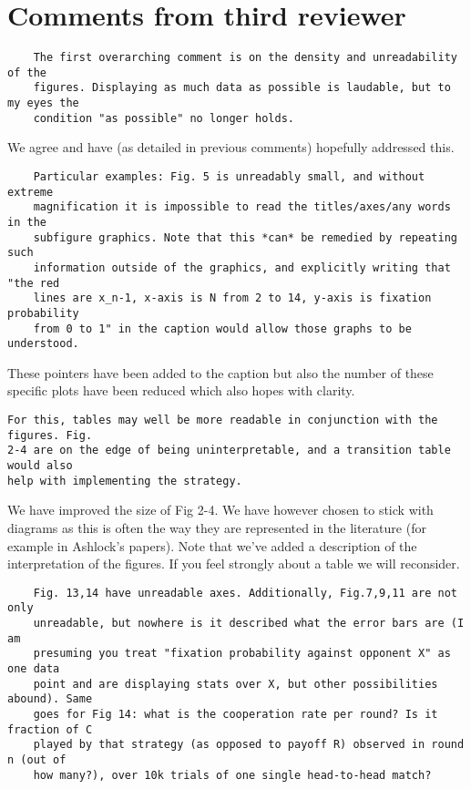 \documentclass[a4]{article}
\begin{document}
\section{Comments from third reviewer}

\begin{verbatim}
    The first overarching comment is on the density and unreadability of the
    figures. Displaying as much data as possible is laudable, but to my eyes the
    condition "as possible" no longer holds.
\end{verbatim}

We agree and have (as detailed in previous comments) hopefully addressed this.

\begin{verbatim}
    Particular examples: Fig. 5 is unreadably small, and without extreme
    magnification it is impossible to read the titles/axes/any words in the
    subfigure graphics. Note that this *can* be remedied by repeating such
    information outside of the graphics, and explicitly writing that "the red
    lines are x_n-1, x-axis is N from 2 to 14, y-axis is fixation probability
    from 0 to 1" in the caption would allow those graphs to be understood.
\end{verbatim}

These pointers have been added to the caption but also the number of these
specific plots have been reduced which also hopes with clarity.

\begin{verbatim}
For this, tables may well be more readable in conjunction with the figures. Fig.
2-4 are on the edge of being uninterpretable, and a transition table would also
help with implementing the strategy.
\end{verbatim}

We have improved the size of Fig 2-4. We have however chosen to stick with
diagrams as this is often the way they are represented in the literature (for
example in Ashlock's papers). Note that we've added a description of the
interpretation of the figures. If you feel strongly about a table we will
reconsider.

\begin{verbatim}
    Fig. 13,14 have unreadable axes. Additionally, Fig.7,9,11 are not only
    unreadable, but nowhere is it described what the error bars are (I am
    presuming you treat "fixation probability against opponent X" as one data
    point and are displaying stats over X, but other possibilities abound). Same
    goes for Fig 14: what is the cooperation rate per round? Is it fraction of C
    played by that strategy (as opposed to payoff R) observed in round n (out of
    how many?), over 10k trials of one single head-to-head match?
\end{verbatim}
\end{document}
